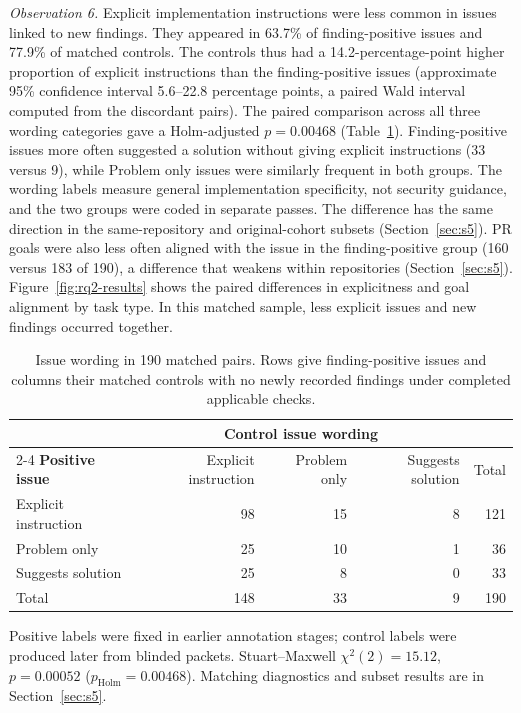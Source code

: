 \documentclass[acmsmall,screen,nonacm,review]{acmart}
\begin{document}
\emph{Observation 6.} Explicit implementation instructions were less common in issues linked to new findings. They appeared in 63.7\% of finding-positive issues and 77.9\% of matched controls. The controls thus had a 14.2-percentage-point higher proportion of explicit instructions than the finding-positive issues (approximate 95\% confidence interval 5.6--22.8 percentage points, a paired Wald interval computed from the discordant pairs). The paired comparison across all three wording categories gave a Holm-adjusted $p=0.00468$ (Table~\ref{tab:rq2}). Finding-positive issues more often suggested a solution without giving explicit instructions (33 versus 9), while Problem only issues were similarly frequent in both groups. The wording labels measure general implementation specificity, not security guidance, and the two groups were coded in separate passes. The difference has the same direction in the same-repository and original-cohort subsets (Section~\ref{sec:s5}). PR goals were also less often aligned with the issue in the finding-positive group (160 versus 183 of 190), a difference that weakens within repositories (Section~\ref{sec:s5}). Figure~\ref{fig:rq2-results} shows the paired differences in explicitness and goal alignment by task type. In this matched sample, less explicit issues and new findings occurred together.

\begin{table}[H]
\caption{Issue wording in 190 matched pairs. Rows give finding-positive issues and columns their matched controls with no newly recorded findings under completed applicable checks.}
\label{tab:rq2}
\small
\begin{tabular}{@{}lrrrr@{}}
\toprule
& \multicolumn{3}{c}{\textbf{Control issue wording}} & \\
\cmidrule(lr){2-4}
\textbf{Positive issue} & Explicit instruction & Problem only & Suggests solution & Total\\
\midrule
Explicit instruction & 98 & 15 & 8 & 121\\
Problem only & 25 & 10 & 1 & 36\\
Suggests solution & 25 & 8 & 0 & 33\\
\midrule
Total & 148 & 33 & 9 & 190\\
\bottomrule
\end{tabular}
\par\smallskip\raggedright\footnotesize Positive labels were fixed in earlier annotation stages; control labels were produced later from blinded packets. Stuart--Maxwell $\chi^2(2)=15.12$, $p=0.00052$ ($p_{\mathrm{Holm}}=0.00468$). Matching diagnostics and subset results are in Section~\ref{sec:s5}.
\end{table}
\end{document}

